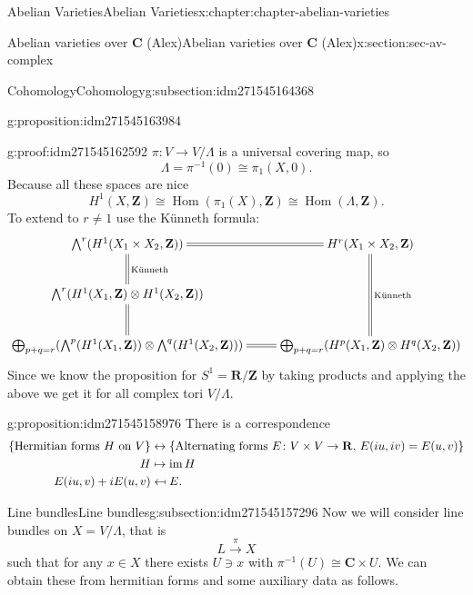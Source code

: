 \documentclass[oneside,10pt,]{book}
\numberwithin{equation}{section}
\providecommand\mapsfrom{\mathrel{\reflectbox{\ensuremath{\mapsto}}}}
\newcommand{\ZZ}{\mathbf{Z}}
\newcommand{\RR}{\mathbf{R}}
\newcommand{\CC}{\mathbf{C}}
\DeclareMathOperator{\Hom}{Hom}
\DeclareMathOperator{\im}{im}
\newcommand{\amp}{&}
\begin{document}
\begin{chapterptx}{Abelian Varieties}{}{Abelian Varieties}{}{}{x:chapter:chapter-abelian-varieties}
\begin{sectionptx}{Abelian varieties over \(\CC\) (Alex)}{}{Abelian varieties over \(\CC\) (Alex)}{}{}{x:section:sec-av-complex}
\begin{subsectionptx}{Cohomology}{}{Cohomology}{}{}{g:subsection:idm271545164368}
\begin{proposition}{}{}{g:proposition:idm271545163984}
%
\end{proposition}
\begin{proofptx}{}{g:proof:idm271545162592}
\(\pi\colon V\to V/\Lambda\) is a universal covering map, so%
\begin{equation*}
\Lambda = \pi^{-1} (0 ) \cong \pi_1(X,0)\text{.}
\end{equation*}
Because all these spaces are nice%
\begin{equation*}
H^1 (X,\ZZ) \cong \Hom(\pi_1(X), \ZZ) \cong \Hom(\Lambda, \ZZ)\text{.}
\end{equation*}
To extend to \(r \ne 1\) use the Künneth formula:%
\begin{equation*}
\xymatrix{
\bigwedge^r(H^1(X_1\times X_2, \ZZ)) \ar@{=}[r]\ar@{=}[d]^{\text{Künneth}} & H^r(X_1\times X_2 , \ZZ)\ar@{=}[dd]^{\text{Künneth}}\\
\bigwedge^r(H^1(X_1, \ZZ)\otimes H^1(X_2, \ZZ)) \ar@{=}[d]& \\
\bigoplus_{p+q=r}(\bigwedge^p(H^1(X_1, \ZZ))\otimes\bigwedge^q(H^1(X_2, \ZZ))) \ar@{=}[r] & \bigoplus_{p+q=r}(H^p(X_1, \ZZ)\otimes H^q(X_2, \ZZ))
}
\end{equation*}
Since we know the proposition for \(S^1 = \RR/\ZZ\) by taking products and applying the above we get it for all complex tori \(V/\Lambda\).%
\end{proofptx}
\begin{proposition}{}{}{g:proposition:idm271545158976}%
There is a correspondence%
\begin{align*}
\{\text{Hermitian forms }H \text{ on } V\} \amp\leftrightarrow\{\text{Alternating forms }E\colon V\times V\to\RR,\,E(iu,iv) = E(u,v)\}\\
H\amp\mapsto \im H\\
E(iu,v)+ i E(u,v) \amp\mapsfrom E\text{.}
\end{align*}
%
\end{proposition}
\end{subsectionptx}
%
%
\typeout{************************************************}
\typeout{************************************************}
%
\begin{subsectionptx}{Line bundles}{}{Line bundles}{}{}{g:subsection:idm271545157296}
Now we will consider line bundles on \(X = V/\Lambda\), that is%
\begin{equation*}
L\xrightarrow{\pi} X
\end{equation*}
such that for any \(x\in X\) there exists \(U\ni x\) with \(\pi^{-1} (U) \cong \CC \times U\). We can obtain these from hermitian forms and some auxiliary data as follows.%

\end{subsectionptx}
\end{sectionptx}
\end{chapterptx}
\end{document}
